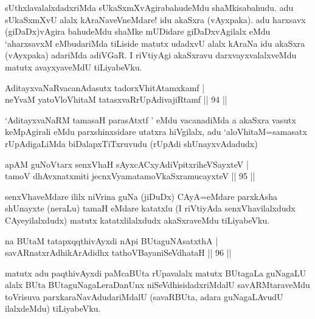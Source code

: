 \begin{artha}
sUthxlavalalxdadxriMda sUkaSxmXvAgirabahudeMdu shaMkisabahudu. adu sUkaSxmXvU alalx kAraNaveVneMdare! idu akaSxra (vAyxpaka). adu harxsavx (giDaDx)vAgira bahudeMdu shaMke mUDidare giDaDxvAgilalx eMdu `aharxsavxM eMbudariMda tiLiside matutx udadxvU alalx kAraNa idu akaSxra (vAyxpaka) adariMda adiVGaR. I riVtiyAgi akaSxravu darxvayxvalalxveMdu matutx avayxyaveMdU tiLiyabeVku.
\end{artha}

\begin{shl}
AditayxvaNaRvacanAdasutx tadorxVhitAtamxkamf |\\
neYvaM yatoV\s loVhitaM tatasxvaRrUpAdivajiRtamf \hfill || 94 ||
\end{shl}

\begin{artha}
`AditayxvaNaRM tamasaH parasAtxtf ' eMdu vacanadiMda a akaSxra vasutx keMpAgirali eMdu parxshinxsidare utatxra hiVgilalx, adu `aloVhitaM=samasatx rUpAdigaLiMda biDalapxTiTxruvudu (rUpAdi shUnayxvAdadudx)
\end{artha}


\begin{shl}
apAM guNoV\s tarx senxVhaH sAyxcACxyA\s diVpitxriheVSayxteV  |\\
tamoV dhAvxnatxmiti jecnxVyamatamoV\s kaSxramucayxteV \hfill || 95 ||
\end{shl}

\begin{artha}
senxVhaveMdare ililx niVrina guNa (jiDuDx) CAyA=eMdare parxkAsha shUnayxte (neraLu) tamaH eMdare katatxlu (I riVtiyAda senxVhavilalxdudx CAyeyilalxdudx) matutx katatxlilalxdudx akaSxraveMdu tiLiyabeVku.
\end{artha}

\begin{shl}
na BUtaM tatapxqqthivAyxdi nApi BUtaguNAsatxthA |\\
savARnatxrAdhikArAdidhx tathoVBayaniSeVdhataH \hfill || 96 ||
\end{shl}

\begin{artha}%
matutx adu paqthivAyxdi paMcaBUta rUpavalalx matutx BUtagaLa guNagaLU alalx BUta BUtaguNagaLeraDanUnx niSeVdhisidadxriMdalU savARMtaraveMdu toVrisuva parxkaraNavAdudariMdalU (savaRBUta, adara guNagaLAvudU ilalxdeMdu) tiLiyabeVku.
\end{artha}

